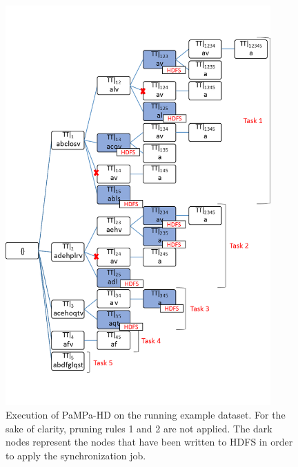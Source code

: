 \begin{figure}[!t]
\includegraphics[width=4in]{chapters/pampa/running_example3_d_A.png}
\caption{Execution of PaMPa-HD on the running example dataset.
For the sake of clarity, pruning rules 1 and 2 are not
applied. The dark nodes represent the nodes that have been written to HDFS in
order to apply the synchronization job.}


\label{running_3}
\end{figure}

